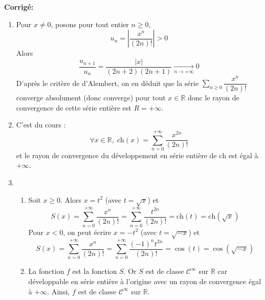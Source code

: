\documentclass[a4paper,twoside,french,11pt]{VcCours}
\newcommand{\Sum}[2]{\sum_{#1}^{#2}}
\newcommand{\corr}{\textbf{Corrigé:}}
\begin{document}
\corr \begin{enumerate}
\item Pour $x \neq 0$, posons  pour tout entier $n \geq 0$,
 $$u_n  = \left\vert \dfrac{x^n }{(2n)!} \right\vert > 0$$
Alors
$$ \dfrac{u_{n+1}}{u_n} = \dfrac{ \vert x \vert }{(2n+2)(2n+1)} \underset{n \rightarrow + \infty}{\longrightarrow} 0$$
D'après le critère de d'Alembert, on en déduit que la série $\Sum{n \geq 0}{} {\dfrac{{x^n }}{{(2n)!}}} $ converge absolument (donc converge) pour tout $x \in \mathbb{R}$ donc le rayon de convergence de cette série entière est $R =  + \infty $.
\item C'est du cours :
$$\forall x\in \mathbb{R} , \; \textrm{ch} (x) = \sum\limits_{n = 0}^{ + \infty } {\dfrac{{x^{2n} }}{{(2n)!}}} $$ 
et le rayon de convergence du développement en série entière de $\textrm{ch}$  est égal à $ + \infty $.
\item 
\begin{enumerate}
\item Soit $x \geq 0$. Alors $x= t^2$ (avec $t = \sqrt{x}$) et 
$$S(x) = \sum\limits_{n = 0}^{ + \infty } {\dfrac{{x^n }}{{(2n)!}}}  = \sum\limits_{n = 0}^{ + \infty } {\dfrac{{t^{2n} }}{{(2n)!}}}  = \textrm{ch} (t) = \textrm{ch}( \sqrt x) $$
Pour $x < 0$, on peut écrire $x =  - t^2 $ (avec $t=\sqrt{-x}$) et 
$$S(x) = \sum\limits_{n = 0}^{ + \infty } {\dfrac{{x^n }}{{(2n)!}}}  = \sum\limits_{n = 0}^{ + \infty } {\dfrac{{( - 1)^n t^{2n} }}{{(2n)!}}}  = \cos (t) = \cos (\sqrt { - x}) $$
\item La fonction $f$ est la fonction $S$. Or $S$ est  de classe $\mathcal{C}^\infty $ sur $\mathbb{R}$ car développable en série entière à l'origine avec un rayon de convergence égal à $+\infty$. Ainsi, $f$ est  de classe $\mathcal{C}^\infty  $ sur $\mathbb{R}$.
\end{enumerate}
\end{enumerate}
\end{document}
